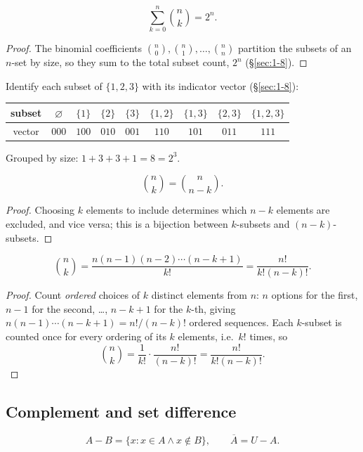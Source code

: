 \documentclass[11pt]{article}
\begin{document}
\begin{theorem}
\[
\sum_{k=0}^{n} \binom{n}{k} = 2^n.
\]
\end{theorem}
\begin{proof}
The binomial coefficients $\binom{n}{0}, \binom{n}{1}, \dots, \binom{n}{n}$ partition the subsets of an $n$-set by size, so they sum to the total subset count, $2^n$ (\S\ref{sec:1-8}).
\end{proof}

\begin{example}[$n=3$ -- CS70]
Identify each subset of $\{1,2,3\}$ with its indicator vector (\S\ref{sec:1-8}):
\begin{center}
\begin{tabular}{c|cccccccc}
subset & $\varnothing$ & $\{1\}$ & $\{2\}$ & $\{3\}$ & $\{1,2\}$ & $\{1,3\}$ & $\{2,3\}$ & $\{1,2,3\}$ \\ \hline
vector & $000$ & $100$ & $010$ & $001$ & $110$ & $101$ & $011$ & $111$
\end{tabular}
\end{center}
Grouped by size: $1+3+3+1=8=2^3$.
\end{example}

\begin{theorem}[Symmetry]
\[
\binom{n}{k} = \binom{n}{n-k}.
\]
\end{theorem}
\begin{proof}
Choosing $k$ elements to include determines which $n-k$ elements are excluded, and vice versa; this is a bijection between $k$-subsets and $(n-k)$-subsets.
\end{proof}

\begin{theorem}
\[
\binom{n}{k} = \frac{n(n-1)(n-2)\cdots(n-k+1)}{k!} = \frac{n!}{k!(n-k)!}.
\]
\end{theorem}
\begin{proof}
Count \emph{ordered} choices of $k$ distinct elements from $n$: $n$ options for the first, $n-1$ for the second, \dots, $n-k+1$ for the $k$-th, giving $n(n-1)\cdots(n-k+1) = n!/(n-k)!$ ordered sequences. Each $k$-subset is counted once for every ordering of its $k$ elements, i.e.\ $k!$ times, so
\[
\binom{n}{k} = \frac{1}{k!} \cdot \frac{n!}{(n-k)!} = \frac{n!}{k!(n-k)!}.
\]
\end{proof}

\subsection{Complement and set difference}
\label{sec:1-11}
\begin{definition}
\[
A - B = \{x : x \in A \wedge x \notin B\}, \qquad
\overline{A} = U - A.
\]
\end{definition}
\end{document}
